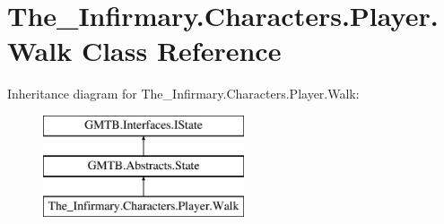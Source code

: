 \hypertarget{class_the___infirmary_1_1_characters_1_1_player_1_1_walk}{}\section{The\+\_\+\+Infirmary.\+Characters.\+Player.\+Walk Class Reference}
\label{class_the___infirmary_1_1_characters_1_1_player_1_1_walk}
Inheritance diagram for The\+\_\+\+Infirmary.\+Characters.\+Player.\+Walk\+:\begin{figure}[H]
\begin{center}
\leavevmode
\includegraphics[height=3.000000cm]{class_the___infirmary_1_1_characters_1_1_player_1_1_walk}
\end{center}
\end{figure}
